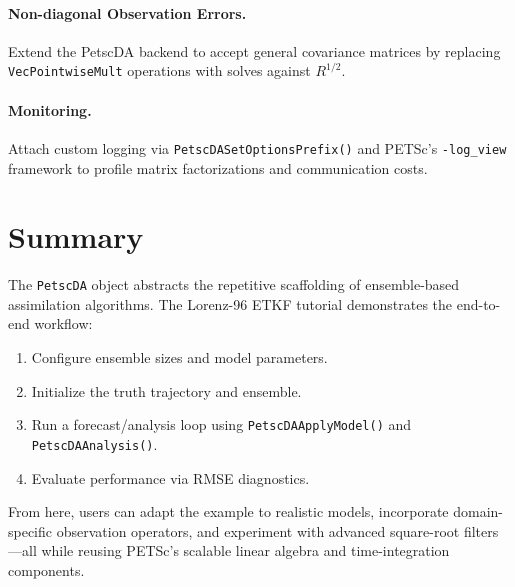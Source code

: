 \documentclass[11pt]{article}
\begin{document}
\paragraph{Non-diagonal Observation Errors.} Extend the PetscDA backend to accept general covariance matrices by replacing \texttt{VecPointwiseMult} operations with solves against $R^{1/2}$.

\paragraph{Monitoring.} Attach custom logging via \texttt{PetscDASetOptionsPrefix()} and PETSc's \texttt{-log\_view} framework to profile matrix factorizations and communication costs.

\section{Summary}

The \texttt{PetscDA} object abstracts the repetitive scaffolding of ensemble-based assimilation algorithms. The Lorenz-96 ETKF tutorial demonstrates the end-to-end workflow:

\begin{enumerate}[nosep]
  \item Configure ensemble sizes and model parameters.
  \item Initialize the truth trajectory and ensemble.
  \item Run a forecast/analysis loop using \texttt{PetscDAApplyModel()} and \texttt{PetscDAAnalysis()}.
  \item Evaluate performance via RMSE diagnostics.
\end{enumerate}

From here, users can adapt the example to realistic models, incorporate domain-specific observation operators, and experiment with advanced square-root filters---all while reusing PETSc's scalable linear algebra and time-integration components.
\end{document}
